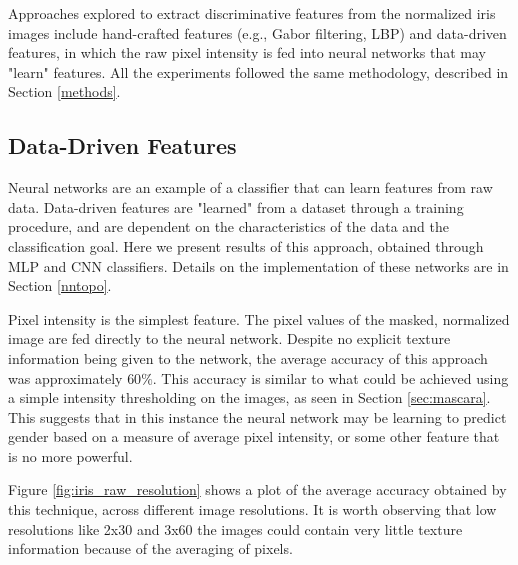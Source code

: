 \documentclass[10pt,twocolumn,letterpaper]{article}
\begin{document}
Approaches explored to extract discriminative features from the normalized iris images include  hand-crafted features (e.g., Gabor filtering, LBP) and data-driven features, in which the raw pixel intensity is fed into neural networks that may "learn" features.
All the experiments followed the same methodology, described in Section \ref{methods}. 

\subsection{Data-Driven Features}

Neural networks are an example of a classifier that can learn features from raw data.
Data-driven features are "learned" from a dataset through a training procedure, and are dependent on the characteristics of the data and the classification goal. 
Here we present results of this approach, obtained through MLP and CNN classifiers. Details on the implementation of these networks are in Section \ref{nntopo}.

Pixel intensity is the simplest feature.
The pixel values of the masked, normalized image are fed directly to the neural network.
Despite no explicit texture information being given to the network, the average accuracy of this approach was approximately $60\%$. 
This accuracy is similar to what could be achieved using a simple intensity thresholding on the images, as seen in Section \ref{sec:mascara}.
This suggests that in this instance the neural network may be learning to predict gender based on a measure of average pixel intensity, or some other feature that is no more powerful.

Figure \ref{fig:iris_raw_resolution} shows a plot of the average accuracy obtained by this technique, across different image resolutions.
It is worth observing that low resolutions like 2x30 and 3x60 the images could contain very little texture information because of the averaging of pixels. 
\end{document}
